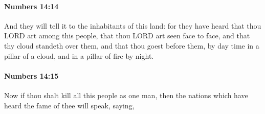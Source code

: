 		\paragraph{Numbers 14:14} %
			\label{NUMBERS-14-14}

			And they will tell it to the inhabitants of this land: for they have heard that thou LORD art among this people, that thou LORD art seen face to face, and that thy cloud standeth over them, and that thou goest before them, by day time in a pillar of a cloud, and in a pillar of fire by night.


		\paragraph{Numbers 14:15} %
			\label{NUMBERS-14-15}

			Now if thou shalt kill all this people as one man, then the nations which have heard the fame of thee will speak, saying,

